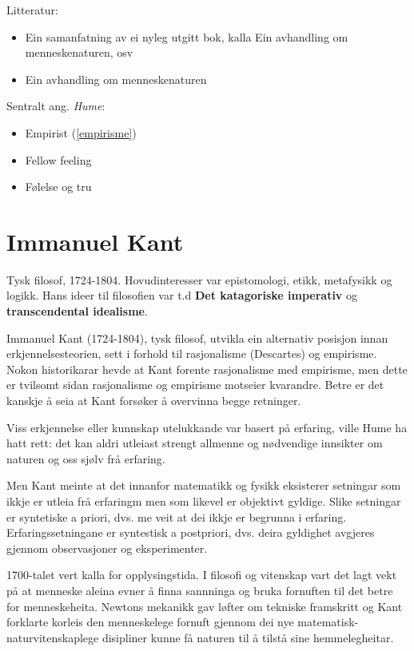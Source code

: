 \documentclass[a4paper]{IEEEtran}
\begin{document}
\begin{center}
Litteratur:
\end{center}
\begin{itemize}\bigskip
    \item Ein samanfatning av ei nyleg utgitt bok, kalla Ein avhandling om menneskenaturen, osv
    \item Ein avhandling om menneskenaturen
\end{itemize}\bigskip 

\begin{center}
Sentralt ang. \textit{Hume}:
\end{center}
\begin{itemize}\bigskip
    \item Empirist (\ref{empirisme})
    \item Fellow feeling
    \item Følelse og tru
\end{itemize}\bigskip


\section{Immanuel Kant}
\label{kant}\bigskip

Tysk filosof, 1724-1804. Hovudinteresser var epistomologi, etikk, metafysikk og logikk. Hans ideer til filosofien var t.d \textbf{Det katagoriske imperativ} og \textbf{transcendental idealisme}.\bigskip

Immanuel Kant (1724-1804), tysk filosof, utvikla ein alternativ posisjon innan erkjennelsesteorien, sett i forhold til rasjonalisme (Descartes) og empirisme. Nokon historikarar hevde at Kant forente rasjonalisme med empirisme, men dette er tvilsomt sidan rasjonalisme og empirisme motseier kvarandre. Betre er det kanskje å seia at Kant forsøker å overvinna begge retninger.\bigskip

Viss erkjennelse eller kunnskap utelukkande var basert på erfaring, ville Hume ha hatt rett: det kan aldri utleiast strengt allmenne og nødvendige innsikter om naturen og oss sjølv frå erfaring.\bigskip

Men Kant meinte at det innanfor matematikk og fysikk eksisterer setningar som ikkje er utleia frå erfaringm men som likevel er objektivt gyldige. Slike setningar er syntetiske a priori, dvs. me veit at dei ikkje er begrunna i erfaring. Erfaringssetningane er syntestisk a postpriori, dvs. deira gyldighet avgjeres gjennom observasjoner og eksperimenter.\bigskip

1700-talet vert kalla for opplysingstida. I filosofi og vitenskap vart det lagt vekt på at menneske aleina evner å finna sannninga og bruka fornuften til det betre for menneskeheita. Newtons mekanikk gav løfter om tekniske framskritt og Kant forklarte korleis den menneskelege fornuft gjennom dei nye matematisk-naturvitenskaplege disipliner kunne få naturen til å tilstå sine hemmelegheitar.\bigskip
\end{document}
